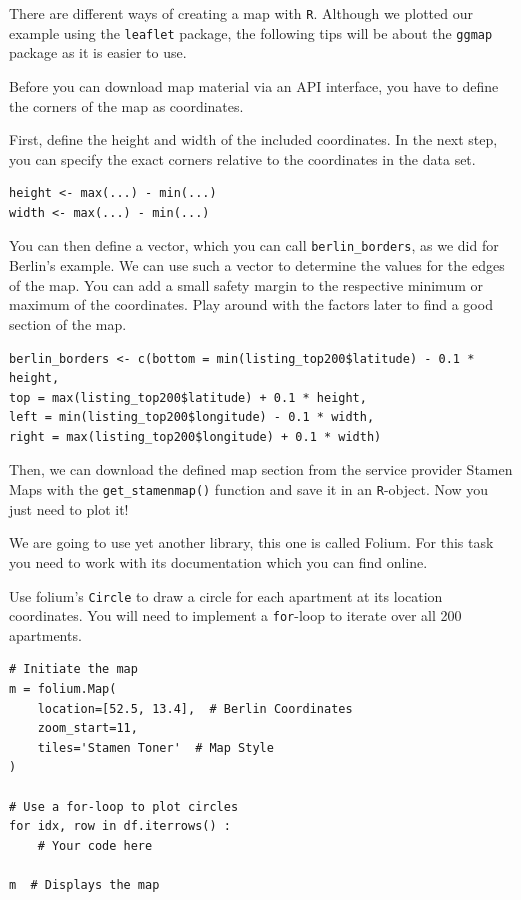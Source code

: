 \documentclass[
  11pt,
]{article}
\newenvironment{tips}[1]
  {
  \begin{itemize}
  \footnotesize
  \renewcommand{\labelitemi}{
    \raisebox{-.7\height}[0pt][0pt]{
      {\setkeys{Gin}{width=3em,keepaspectratio}
        \texttt{[image: images/\#1.png]}}
    }
  }
  \setlength{\fboxsep}{1em}
  \begin{rbox}
  \item
  }
  {
  \end{rbox}
  \end{itemize}
  }
\newenvironment{tipsp}[1]
  {
  \begin{itemize}
  \footnotesize
  \renewcommand{\labelitemi}{
    \raisebox{-.7\height}[0pt][0pt]{
      {\setkeys{Gin}{width=3em,keepaspectratio}
        \texttt{[image: images/\#1.png]}}
    }
  }
  \setlength{\fboxsep}{1em}
  \begin{pbox}
  \item
  }
  {
  \end{pbox}
  \end{itemize}
  }
\begin{document}
\begin{tips}r
There are different ways of creating a map with \texttt{R}.
Although we plotted our example using the \texttt{leaflet} package, the following tips will be about the \texttt{ggmap} package as it is easier to use.

Before you can download map material via an API interface, you have to define the corners of the map as coordinates.

First, define the height and width of the included coordinates.
In the next step, you can specify the exact corners relative to the coordinates in the data set.

\begin{verbatim}
height <- max(...) - min(...)
width <- max(...) - min(...)
\end{verbatim}

You can then define a vector, which you can call \texttt{berlin\_borders}, as we did for Berlin's example.
We can use such a vector to determine the values for the edges of the map.
You can add a small safety margin to the respective minimum or maximum of the coordinates.
Play around with the factors later to find a good section of the map.

\begin{verbatim}
berlin_borders <- c(bottom = min(listing_top200$latitude) - 0.1 * height,
top = max(listing_top200$latitude) + 0.1 * height,
left = min(listing_top200$longitude) - 0.1 * width,
right = max(listing_top200$longitude) + 0.1 * width)
\end{verbatim}

Then, we can download the defined map section from the service provider Stamen Maps with the \texttt{get\_stamenmap()} function and save it in an \texttt{R}-object.
Now you just need to plot it!

\end{tips}

\begin{tipsp}p

We are going to use yet another library, this one is called Folium.
For this task you need to work with its documentation which you can find online.

Use folium's \texttt{Circle} to draw a circle for each apartment at its location coordinates.
You will need to implement a \texttt{for}-loop to iterate over all 200 apartments.

\begin{verbatim}
# Initiate the map
m = folium.Map(
    location=[52.5, 13.4],  # Berlin Coordinates
    zoom_start=11,
    tiles='Stamen Toner'  # Map Style
)

# Use a for-loop to plot circles
for idx, row in df.iterrows() :
    # Your code here

m  # Displays the map
\end{verbatim}


\end{tipsp}
\end{document}
